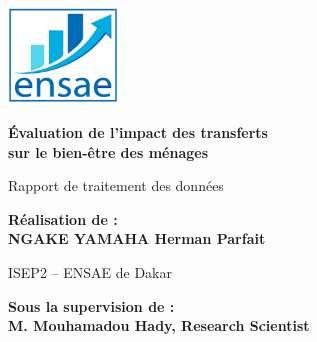 \begin{titlepage}

\begin{center}
\begin{minipage}[c][0.95\textheight][c]{0.98\textwidth}
  \centering

  \includegraphics[width=0.22\textwidth]{logo_ENSAE.png} \\
  \vspace{1.8cm}

  {\Huge \bfseries Évaluation de l’impact des transferts\\[0.3cm] sur le bien-être des ménages \par}
  \vspace{1.8cm}

  {\Large Rapport de traitement des données \par}
  \vspace{2.5cm}

  {\LARGE \textbf{Réalisation de :}\\[0.3cm] \textbf{NGAKE YAMAHA Herman Parfait} \par}
  \vspace{1.2cm}

  {\Large ISEP2 – ENSAE de Dakar \par}
  \vspace{1.2cm}

  {\LARGE \textbf{Sous la supervision de :}\\[0.3cm] \textbf{M. Mouhamadou Hady, Research Scientist} \par}
  \vspace{1.2cm}

\end{minipage}
\end{center}

\end{titlepage}
